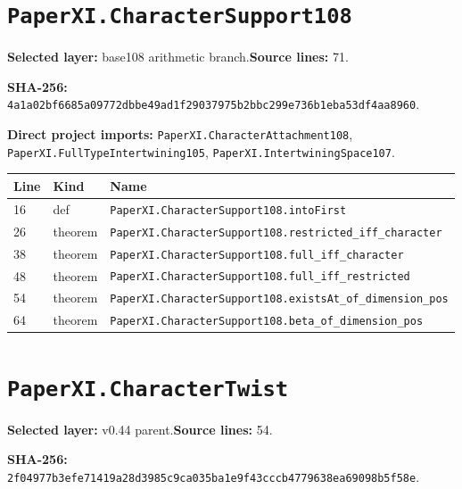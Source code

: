 \documentclass[10pt,oneside]{book}
\begin{document}
\section{\texorpdfstring{\nolinkurl{PaperXI.CharacterSupport108}}{PaperXI.CharacterSupport108}}\label{module:PaperXI.CharacterSupport108}

\textbf{Selected layer:} base108 arithmetic branch.\quad\textbf{Source lines:} 71.\par\textbf{SHA-256:} {\scriptsize\nolinkurl{4a1a02bf6685a09772dbbe49ad1f29037975b2bbc299e736b1eba53df4aa8960}}.


\textbf{Direct project imports:} \nolinkurl{PaperXI.CharacterAttachment108}, \nolinkurl{PaperXI.FullTypeIntertwining105}, \nolinkurl{PaperXI.IntertwiningSpace107}.

\begin{longtable}{@{}p{}p{}p{}@{}}\toprule Line&Kind&Name\\\midrule\endhead

16&def&\nolinkurl{PaperXI.CharacterSupport108.intoFirst}\\

26&theorem&\nolinkurl{PaperXI.CharacterSupport108.restricted_iff_character}\\

38&theorem&\nolinkurl{PaperXI.CharacterSupport108.full_iff_character}\\

48&theorem&\nolinkurl{PaperXI.CharacterSupport108.full_iff_restricted}\\

54&theorem&\nolinkurl{PaperXI.CharacterSupport108.existsAt_of_dimension_pos}\\

64&theorem&\nolinkurl{PaperXI.CharacterSupport108.beta_of_dimension_pos}\\

\bottomrule\end{longtable}

\section{\texorpdfstring{\nolinkurl{PaperXI.CharacterTwist}}{PaperXI.CharacterTwist}}\label{module:PaperXI.CharacterTwist}

\textbf{Selected layer:} v0.44 parent.\quad\textbf{Source lines:} 54.\par\textbf{SHA-256:} {\scriptsize\nolinkurl{2f04977b3efe71419a28d3985c9ca035ba1e9f43cccb4779638ea69098b5f58e}}.
\end{document}

